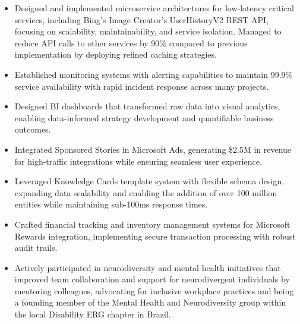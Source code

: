 \begin{itemize}
    \item \scriptsize{Designed and implemented microservice architectures for low-latency critical
        services, including Bing's Image Creator's UserHistoryV2 REST API, focusing on scalability,
        maintainability, and service isolation. Managed to reduce API calls to other services by 90\%
        compared to previous implementation by deploying refined caching strategies.}
    
    \item \scriptsize{Established monitoring systems with alerting capabilities to maintain 99.9\%
        service availability with rapid incident response across many projects.}

    \item \scriptsize{Designed BI dashboards that transformed raw data into visual analytics, enabling
        data-informed strategy development and quantifiable business outcomes.}

    \item \scriptsize{Integrated Sponsored Stories in Microsoft Ads, generating \$2.5M in revenue for
        high-traﬀic integrations while ensuring seamless user experience.}

    \item \scriptsize{Leveraged Knowledge Cards template system with flexible schema design, expanding
        data scalability and enabling the addition of over 100 million entities while maintaining
        sub-100ms response times.}

    \item \scriptsize{Crafted financial tracking and inventory management systems for Microsoft Rewards
        integration, implementing secure transaction processing with robust audit trails.}

    \item \scriptsize{Actively participated in neurodiversity and mental health initiatives that
        improved team collaboration and support for neurodivergent individuals by mentoring colleagues,
        advocating for inclusive workplace practices and being a founding member of the Mental Health and
        Neurodiversity group within the local Disability ERG chapter in Brazil.}
\end{itemize}